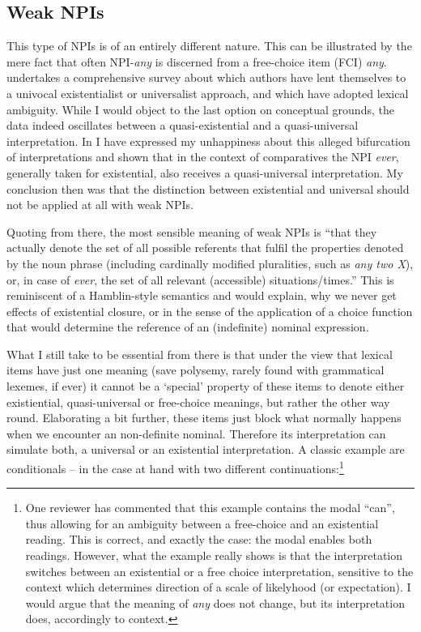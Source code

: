 \documentclass[output=paper,colorlinks,citecolor=brown,
]{langscibook}
\begin{document}
\subsection{Weak NPIs}

This type of NPIs is of an entirely different nature. This can be illustrated by the mere fact that often NPI-\textit{any} is discerned from a
free-choice item (FCI) \textit{any}. \citet{horn2000a} undertakes
a comprehensive survey about which authors have lent themselves to a univocal existentialist or universalist approach, and
which have adopted lexical ambiguity. While I would object to the last option on conceptual grounds, the data indeed
oscillates between a quasi-existential and a quasi-universal interpretation. In \citet{neubarth2017} I have expressed
my unhappiness about this alleged bifurcation of interpretations and shown that in the context of comparatives the NPI
\textit{ever}, generally taken for existential, also receives a quasi-universal interpretation. My conclusion then was
that the distinction between existential and universal should not be applied at all with weak NPIs.

Quoting from there, the most sensible meaning of weak NPIs is ``that they actually denote the set of all possible
referents that fulfil the properties denoted by the noun phrase (including cardinally modified pluralities, such as
{\em any two X}), or, in case of {\em ever}, the set of all relevant (accessible) situations/times.'' This is
reminiscent of a Hamblin-style semantics \citep{hamblin1973} and would explain, why we never get effects of existential
closure, or in the sense of \cite{reinhart1997} the application of a choice function that would determine the reference
of an (indefinite) nominal expression.

What I still take to be essential from there is that under the view that lexical items have just one meaning (save
polysemy, rarely found with grammatical lexemes, if ever) it cannot be a `special' property of these items to denote
either existiential, quasi-universal or free-choice meanings, but rather the other way round. Elaborating a bit
further, these items just block what normally happens when we encounter an non-definite nominal. Therefore its
interpretation can simulate both, a universal or an existential interpretation. A classic example are conditionals --
in the case at hand with two different continuations:\footnote{One reviewer has commented that this example contains
the modal ``can'', thus allowing for an ambiguity between a free-choice and an existential reading. This is correct,
and exactly the case: the modal enables both readings. However, what the example really shows is that the
interpretation switches between an existential or a free choice interpretation, sensitive to the context which
determines direction of a scale of likelyhood (or expectation). I would argue that the meaning of {\em any} does not
change, but its interpretation does, accordingly to context.}
\end{document}
